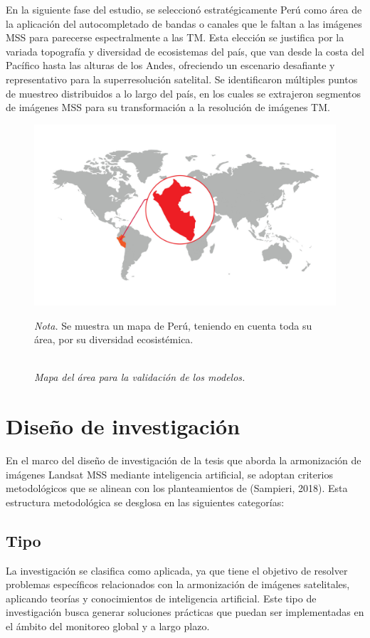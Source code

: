         En la siguiente fase del estudio, se seleccionó estratégicamente Perú como área de la aplicación del autocompletado de bandas o canales que le faltan a las imágenes MSS para parecerse espectralmente a las TM. Esta elección se justifica por la variada topografía y diversidad de ecosistemas del país, que van desde la costa del Pacífico hasta las alturas de los Andes, ofreciendo un escenario desafiante y representativo para la superresolución satelital. Se identificaron múltiples puntos de muestreo distribuidos a lo largo del país, en los cuales se extrajeron segmentos de imágenes MSS para su transformación a la resolución de imágenes TM. 

        \begin{figure}[H] 
            \caption{\doublespacing \\ \textit{Mapa del área para la validación de los modelos.}} 
            \centering
            \includegraphics[width=0.8\linewidth]{2_CAPITULO4/IMG/mapa_peru.jpg}
            \begin{justify}
                \textit{Nota.} Se muestra un mapa de Perú, teniendo en cuenta toda su área, por su diversidad ecosistémica.
            \end{justify}                    
            \label{peru}
        \end{figure}

    \section{Diseño de investigación}
        En el marco del diseño de investigación de la tesis que aborda la armonización de imágenes Landsat MSS mediante inteligencia artificial, se adoptan criterios metodológicos que se alinean con los planteamientos de (Sampieri, 2018). Esta estructura metodológica se desglosa en las siguientes categorías:
        \subsection{Tipo}
            La investigación se clasifica como aplicada, ya que tiene el objetivo de resolver problemas específicos relacionados con la armonización de imágenes satelitales, aplicando teorías y conocimientos de inteligencia artificial. Este tipo de investigación busca generar soluciones prácticas que puedan ser implementadas en el ámbito del monitoreo global y a largo plazo.

